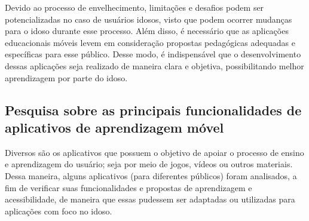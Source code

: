 Devido ao processo de envelhecimento, limitações e desafios podem ser potencializadas no caso de usuários idosos, visto que podem ocorrer mudanças para o idoso durante esse processo. Além disso, é necessário que as aplicações educacionais móveis levem em consideração propostas pedagógicas adequadas e específicas para esse público. Desse modo, é indispensável que o desenvolvimento dessas aplicações seja realizado de maneira clara e objetiva, possibilitando melhor aprendizagem por parte do idoso.

\subsection{Pesquisa sobre as principais funcionalidades de aplicativos de aprendizagem móvel}
Diversos são os aplicativos que possuem o objetivo de apoiar o processo de ensino e aprendizagem do usuário; seja por meio de jogos, vídeos ou outros materiais. Dessa maneira, alguns aplicativos (para diferentes públicos) foram analisados, a fim de verificar suas funcionalidades e propostas de aprendizagem e acessibilidade, de maneira que essas pudessem ser adaptadas ou utilizadas para aplicações com foco no idoso.

